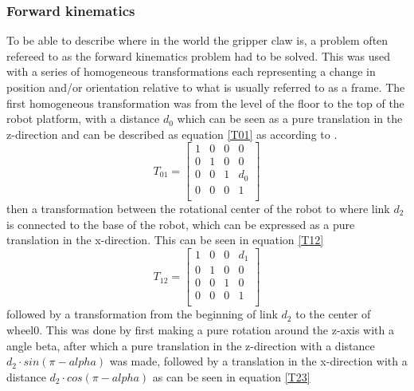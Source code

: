 \subsubsection{Forward kinematics}
To be able to describe where in the world the gripper claw is, a problem often refereed to as the forward kinematics problem \parencite{Spong2004} had to be solved. This was used with a series of homogeneous transformations each representing a change in position and/or orientation relative to what is usually referred to as a frame. The first homogeneous transformation was from the level of the floor to the top of the robot platform, with a distance \(d_0\) which can be seen as a pure translation in the z-direction and can be described as equation \ref{T01} as according to \parencite{Spong2004}.
\begin{equation}
    T_{01} = 
    \begin{bmatrix}
    1&0&0&0\\
    0&1&0&0\\
    0&0&1&d_0\\
    0&0&0&1\\
    \end{bmatrix}
    \label{T01}
\end{equation}
then a transformation between the rotational center of the robot to where link \(d_2\) is connected to the base of the robot, which can be expressed as a pure translation in the x-direction. This can be seen in equation \ref{T12}
\begin{equation}
    T_{12} = 
    \begin{bmatrix}
    1&0&0&d_1\\
    0&1&0&0\\
    0&0&1&0\\
    0&0&0&1\\
    \end{bmatrix}
    \label{T12}
\end{equation}
followed by a transformation from the beginning of link \(d_2\) to the center of wheel0. This was done by first making a pure rotation around the z-axis with a angle beta, after which a pure translation in the z-direction with a distance \(d_2\cdot sin(\pi-alpha)\) was made, followed by a translation in the x-direction with a distance \(d_2\cdot cos(\pi - alpha)\) as can be seen in equation \ref{T23}
